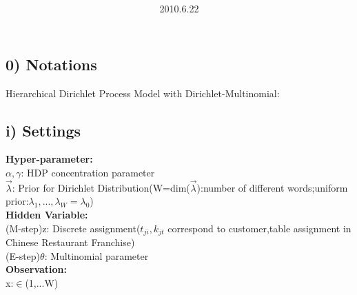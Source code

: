 \documentclass{article}
\title{\vspace{0.3in}\textmd{\textbf{\hmwkTitle}}}
\date{2010.6.22}
\author{\textbf{\hmwkAuthorName}}
\begin{document}
\begin{spacing}{1.1}
\maketitle
\section{0) Notations }
Hierarchical Dirichlet Process Model with Dirichlet-Multinomial:
\subsection{i) Settings}
{\bf Hyper-parameter:}\\
$\alpha,\gamma$: HDP concentration parameter\\
$\vec \lambda$: Prior for Dirichlet Distribution(W=dim($\vec \lambda$):number of different words;uniform prior:$\lambda_{1},...,\lambda_{W}=\lambda_{0}$)\\
{\bf Hidden Variable:}\\
(M-step)z: Discrete assignment($t_{ji},k_{jt}$ correspond to customer,table assignment in Chinese Restaurant Franchise)\\
(E-step)$\theta$: Multinomial parameter\\
{\bf Observation:}\\
x:$\in$(1,...W)\\ \\

\end{spacing}
\end{document}
